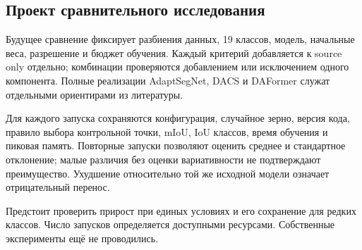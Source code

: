 \subsection{Проект сравнительного исследования}
Будущее сравнение фиксирует разбиения данных, 19 классов, модель, начальные веса, разрешение и бюджет обучения. Каждый критерий добавляется к source only отдельно; комбинации проверяются добавлением или исключением одного компонента. Полные реализации AdaptSegNet, DACS и DAFormer служат отдельными ориентирами из литературы.

Для каждого запуска сохраняются конфигурация, случайное зерно, версия кода, правило выбора контрольной точки, mIoU, IoU классов, время обучения и пиковая память. Повторные запуски позволяют оценить среднее и стандартное отклонение; малые различия без оценки вариативности не подтверждают преимущество. Ухудшение относительно той же исходной модели означает отрицательный перенос.

Предстоит проверить прирост при единых условиях и его сохранение для редких классов. Число запусков определяется доступными ресурсами. Собственные эксперименты ещё не проводились.


